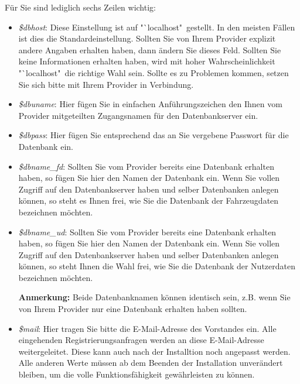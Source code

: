 \documentclass[fontsize = 12pt, paper = a4]{scrreprt}
\begin{document}
\newpage

Für Sie sind lediglich sechs Zeilen wichtig: 

\begin{itemize}[leftmargin=*]

\item \textit{\$dbhost}: Diese Einstellung ist auf "`localhost"\ gestellt. In den meisten Fällen ist dies die Standardeinstellung. Sollten Sie von Ihrem Provider explizit andere Angaben erhalten haben, dann ändern Sie dieses Feld. Sollten Sie keine Informationen erhalten haben, wird mit hoher Wahrscheinlichkeit "`localhost"\ die richtige Wahl sein. Sollte es zu Problemen kommen, setzen Sie sich bitte mit Ihrem Provider in Verbindung.


\item \textit{\$dbuname}: Hier fügen Sie in einfachen Anführungszeichen den Ihnen vom Provider mitgeteilten Zugangsnamen für den Datenbankserver ein.


\item \textit{\$dbpass}: Hier fügen Sie entsprechend das an Sie vergebene Passwort für die Datenbank ein.

\item \textit{\$dbname\_fd}: Sollten Sie vom Provider bereits eine Datenbank erhalten haben, so fügen Sie hier den Namen der Datenbank ein. Wenn Sie vollen Zugriff auf den Datenbankserver haben und selber Datenbanken anlegen können, so steht es Ihnen frei, wie Sie die Datenbank der Fahrzeugdaten bezeichnen möchten.


\item \textit{\$dbname\_ud}: Sollten Sie vom Provider bereits eine Datenbank erhalten haben, so fügen Sie hier den Namen der Datenbank ein. Wenn Sie vollen Zugriff auf den Datenbankserver haben und selber Datenbanken anlegen können, so steht Ihnen die Wahl frei, wie Sie die Datenbank der Nutzerdaten bezeichnen möchten.

\textbf{Anmerkung:} Beide Datenbanknamen können identisch sein, z.B. wenn Sie von Ihrem Provider nur eine Datenbank erhalten haben sollten. 

\item \textit{\$mail}: Hier tragen Sie bitte die E-Mail-Adresse des Vorstandes ein. Alle eingehenden Registrierungsanfragen werden an diese E-Mail-Adresse weitergeleitet. Diese kann auch nach der Installtion noch angepasst werden. Alle anderen Werte müssen ab dem Beenden der Installation unverändert bleiben, um die volle Funktionsfähigkeit gewährleisten zu können.

\end{itemize}
\end{document}

